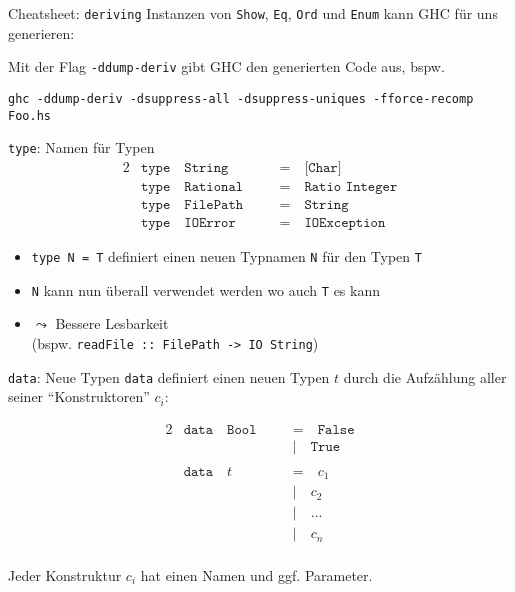 \documentclass{beamer}
\begin{document}
\begin{frame}{Cheatsheet: \texttt{deriving}}
  Instanzen von \texttt{Show}, \texttt{Eq}, \texttt{Ord} und \texttt{Enum} kann GHC für uns generieren:


  Mit der Flag \texttt{-ddump-deriv} gibt GHC den generierten Code aus, bspw.

  \tiny \texttt{ghc -ddump-deriv -dsuppress-all -dsuppress-uniques -fforce-recomp Foo.hs}
\end{frame}

\begin{frame}{\texttt{type}: Namen für Typen}
    \begin{alignat*}{2}
        & \texttt{type} \quad \texttt{String} \quad && \texttt{=} \quad \texttt{[Char]} \\
        & \texttt{type} \quad \texttt{Rational} \quad && \texttt{=} \quad \texttt{Ratio Integer} \\
        & \texttt{type} \quad \texttt{FilePath} \quad && \texttt{=} \quad \texttt{String} \\
        & \texttt{type} \quad \texttt{IOError} \quad && \texttt{=} \quad \texttt{IOException}
    \end{alignat*}

    \begin{itemize}
        \item \texttt{type N = T} definiert einen neuen Typnamen \texttt{N} für den Typen \texttt{T}
        \item \texttt{N} kann nun überall verwendet werden wo auch \texttt{T} es kann
        \item $\leadsto$ Bessere Lesbarkeit\\
              (bspw. \texttt{readFile :: FilePath -> IO String})
    \end{itemize}
\end{frame}

\begin{frame}{\texttt{data}: Neue Typen}
    \texttt{data} definiert einen neuen Typen $t$ durch die Aufzählung aller seiner \enquote{Konstruktoren} $c_i$:

    \begin{alignat*}{2}
        & \texttt{data} \quad \texttt{Bool} \quad && \texttt{=} \quad \texttt{False} \\
        &               \quad               \quad && \texttt{|} \quad \texttt{True}  \\
        \\
        & \texttt{data} \quad t             \quad && \texttt{=} \quad c_1            \\
        &               \quad               \quad && \texttt{|} \quad c_2            \\
        &               \quad               \quad && \texttt{|} \quad ...            \\
        &               \quad               \quad && \texttt{|} \quad c_n            \\
    \end{alignat*}

    Jeder Konstruktur $c_i$ hat einen Namen und ggf. Parameter.
\end{frame}
\end{document}

